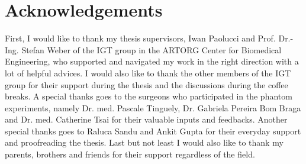 \chapter*{Acknowledgements}
   
First, I would like to thank my thesis supervisors, Iwan Paolucci and
  Prof. Dr.-Ing. Stefan Weber of the IGT group in the ARTORG Center for
  Biomedical Engineering, who supported and navigated my work in the right
  direction with a lot of helpful advices.
  I would also like to thank the other
  members of the IGT group for their support during the thesis and the discussions
  during the coffee breaks. 
  A special thanks goes to the surgeons who
  participated in the phantom experiments, namely Dr. med. Pascale Tinguely, Dr.
  Gabriela Pereira Bom Braga and Dr. med. Catherine Tsai for their valuable
  inputs and feedbacks. Another special thanks goes to Raluca Sandu and Ankit
  Gupta for their everyday support and proofreading the thesis.
 Last but not least I would also like to thank my parents, brothers and friends for their support regardless
of the field.

\endinput
